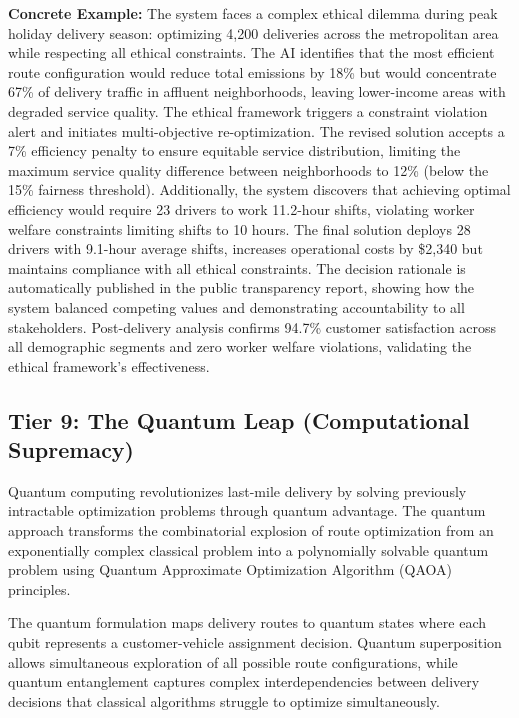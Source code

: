 \documentclass{article}
\begin{document}
\textbf{Concrete Example:} The system faces a complex ethical dilemma during peak holiday delivery season: optimizing 4,200 deliveries across the metropolitan area while respecting all ethical constraints. The AI identifies that the most efficient route configuration would reduce total emissions by 18\% but would concentrate 67\% of delivery traffic in affluent neighborhoods, leaving lower-income areas with degraded service quality. The ethical framework triggers a constraint violation alert and initiates multi-objective re-optimization. The revised solution accepts a 7\% efficiency penalty to ensure equitable service distribution, limiting the maximum service quality difference between neighborhoods to 12\% (below the 15\% fairness threshold). Additionally, the system discovers that achieving optimal efficiency would require 23 drivers to work 11.2-hour shifts, violating worker welfare constraints limiting shifts to 10 hours. The final solution deploys 28 drivers with 9.1-hour average shifts, increases operational costs by \$2,340 but maintains compliance with all ethical constraints. The decision rationale is automatically published in the public transparency report, showing how the system balanced competing values and demonstrating accountability to all stakeholders. Post-delivery analysis confirms 94.7\% customer satisfaction across all demographic segments and zero worker welfare violations, validating the ethical framework's effectiveness.

\subsection{Tier 9: The Quantum Leap (Computational Supremacy)}

Quantum computing revolutionizes last-mile delivery by solving previously intractable optimization problems through quantum advantage. The quantum approach transforms the combinatorial explosion of route optimization from an exponentially complex classical problem into a polynomially solvable quantum problem using Quantum Approximate Optimization Algorithm (QAOA) principles.

The quantum formulation maps delivery routes to quantum states where each qubit represents a customer-vehicle assignment decision. Quantum superposition allows simultaneous exploration of all possible route configurations, while quantum entanglement captures complex interdependencies between delivery decisions that classical algorithms struggle to optimize simultaneously.
\end{document}
